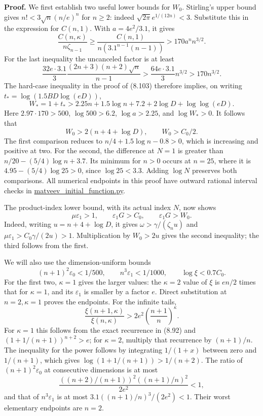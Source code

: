 \documentclass[
  11pt,
  a4paper,
]{article}
\begin{document}
\textbf{Proof.} We first establish two useful lower bounds for \(W_0\).
Stirling's upper bound gives \(n!<3\sqrt n(n/e)^n\) for \(n\ge2\):
indeed \(\sqrt{2\pi}e^{1/(12n)}<3\). Substitute this in the expression
for \(C(n,1)\). With \(a=4e^2/3.1\), it gives \[
\frac{C(n,\kappa)}{n\zeta_{n-1}}
\ge\frac{C(n,1)}{n(3.1^{n-1}(n-1))}
>170a^nn^{3/2}.
\] For the last inequality the uncanceled factor is at least \[
\frac{32e\cdot3.1}{3}
\frac{(2n+3)(n+2)\sqrt n}{n-1}
>\frac{64e\cdot3.1}{3}n^{3/2}>170n^{3/2}.
\] The hard-case inequality in the proof of (8.103) therefore implies,
on writing \(t_*=\log(1.5BD\log(eD))\), \[
W_*=1+t_*>
2.25n+1.5\log n+7.2+2\log D+\log\log(eD).
\] Here \(2.97\cdot170>500\), \(\log500>6.2\), \(\log a>2.25\), and
\(\log W_*>0\). It follows that \[
W_0>2(n+4+\log D),\qquad W_0>C_0/2.
\tag{8.106}
\] The first comparison reduces to \(n/4+1.5\log n-0.8>0\), which is
increasing and positive at two. For the second, the difference at
\(N=1\) is greater than \(n/20-(5/4)\log n+3.7\). Its minimum for
\(n>0\) occurs at \(n=25\), where it is \(4.95-(5/4)\log25>0\), since
\(\log25<3.3\). Adding \(\log N\) preserves both comparisons. All
numerical endpoints in this proof have outward rational interval checks
in
\href{https://kokunoyumeto.github.io/open-math-courses-public/courses/TR-BAKER/verification/matveev_initial_function.py}{matveev\_initial\_function.py}.

The product-index lower bound, with its actual index \(N\), now shows \[
\mu\varepsilon_1>1,\qquad
\varepsilon_1G>C_0,\qquad
\varepsilon_1G>W_0.
\] Indeed, writing \(u=n+4+\log D\), it gives
\(\omega>\gamma/(\zeta_nu)\) and \(\mu\varepsilon_1>C_0\gamma/(2u)>1\).
Multiplication by \(W_0>2u\) gives the second inequality; the third
follows from the first.

We will also use the dimension-uniform bounds \[
(n+1)^2\varepsilon_0<1/500,\qquad
n^3\varepsilon_1<1/1000,\qquad
\log\xi<0.7C_0.
\tag{8.107}
\] For the first two, \(\kappa=1\) gives the larger values: the
\(\kappa=2\) value of \(\xi\) is \(en/2\) times that for \(\kappa=1\),
and its \(\varepsilon_1\) is smaller by a factor \(e\). Direct
substitution at \(n=2,\kappa=1\) proves the endpoints. For the infinite
tails, \[
\frac{\xi(n+1,\kappa)}{\xi(n,\kappa)}
>2e^2\left(\frac{n+1}{n}\right)^\kappa.
\] For \(\kappa=1\) this follows from the exact recurrence in (8.92) and
\((1+1/(n+1))^{n+2}>e\); for \(\kappa=2\), multiply that recurrence by
\((n+1)/n\). The inequality for the power follows by integrating
\(1/(1+x)\) between zero and \(1/(n+1)\), which gives
\(\log(1+1/(n+1))>1/(n+2)\). The ratio of \((n+1)^2\varepsilon_0\) at
consecutive dimensions is at most \[
\frac{((n+2)/(n+1))^2((n+1)/n)^2}{2e^2}<1,
\] and that of \(n^3\varepsilon_1\) is at most
\(3.1((n+1)/n)^3/(2e^2)<1\). Their worst elementary endpoints are
\(n=2\).
\end{document}
